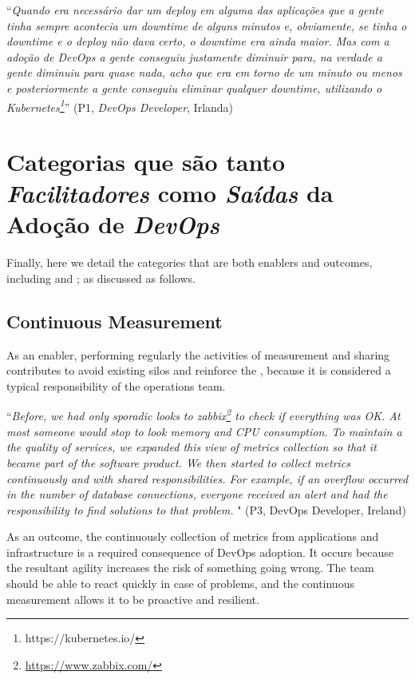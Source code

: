 \begin{mq}
``\emph{Quando era necessário dar um deploy em alguma das aplicações que a
gente tinha sempre acontecia um downtime de alguns minutos e, obviamente, se
tinha o downtime e o deploy não dava certo, o downtime era ainda maior. Mas com
a adoção de DevOps a gente conseguiu justamente diminuir para, na verdade a
gente diminuiu para quase nada, acho que era em torno de um minuto ou menos e
posteriormente a gente conseguiu eliminar qualquer downtime, utilizando o
Kubernetes\footnote{https://kubernetes.io/}}''
(P1, {\it DevOps Developer}, Irlanda)
\end{mq}

\section{Categorias que são tanto \emph{Facilitadores} como \emph{Saídas} da Adoção de \emph{DevOps}}
\label{secao_facilitadores_e_saidas}

Finally, here we detail the categories that are both enablers
and outcomes, including 
and ; as discussed as follows.

\subsection{Continuous Measurement}

As an enabler, performing regularly the
activities of measurement and sharing
contributes to avoid existing silos and reinforce the \cc, because it is
considered a typical responsibility of the operations team.

\begin{mq}
``\emph{Before, we had only sporadic looks to
zabbix\footnote{\url{https://www.zabbix.com/}} to check if everything was OK.
At most someone would stop to look memory and CPU consumption. To maintain a
the quality of services, we expanded this view of metrics collection so that it
became part of the software product. We then started to collect metrics continuously
and with shared responsibilities. For example, if an overflow occurred in the
number of database connections, everyone received an alert and had
the responsibility to find solutions to that problem. %
}" (P3, DevOps Developer, Ireland)
\end{mq}

As an outcome, the continuously collection of metrics from applications and
infrastructure is a required consequence of DevOps adoption. It occurs because
the resultant agility increases the risk of something going wrong. The team
should be able to react quickly in case of problems, and the continuous
measurement allows it to be proactive and resilient.

